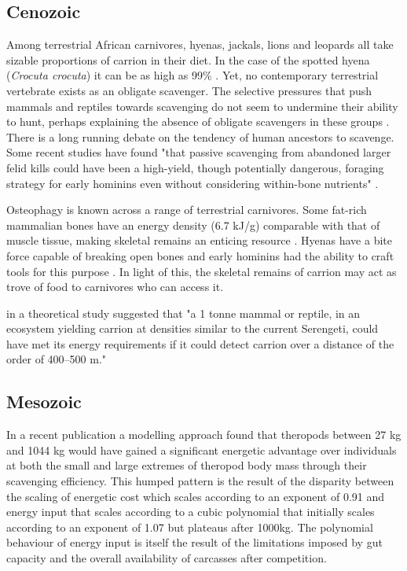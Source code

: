\documentclass[a4paper,12pt]{article}
\begin{document}
\subsection*{Cenozoic}
Among terrestrial African carnivores, hyenas, jackals, lions and leopards all take sizable proportions of carrion in their diet.
In the case of the spotted hyena (\textit{Crocuta crocuta}) it can be as high as 99\% \citep{benbow2015introduction}. 
Yet, no contemporary terrestrial vertebrate exists as an obligate scavenger. 
The selective pressures that push mammals and reptiles towards scavenging do not seem to undermine their ability to hunt, perhaps explaining the absence of obligate scavengers in these groups \citep{ruxton2004obligate}.
\\There is a long running debate on the tendency of human ancestors to scavenge. 
Some recent studies have found "that passive scavenging from abandoned larger felid kills could have been a high-yield, though potentially dangerous, foraging strategy for early hominins even without considering within-bone nutrients" \citep{pobiner2015new}. 

Osteophagy is known across a range of terrestrial carnivores.
Some fat-rich mammalian bones have an energy density (6.7 kJ/g) comparable with that of muscle tissue, making skeletal remains an enticing resource \citep{brown1989study}. 
Hyenas have a bite force capable of breaking open bones and early hominins had the ability to craft tools for this purpose \citep{hone2010feeding,ARCM:ARCM12084}. 
In light of this, the skeletal remains of carrion may act as trove of food to carnivores who can access it.  

\cite{ruxton2004obligate} in a theoretical study suggested that "a 1 tonne mammal or reptile, in an ecosystem yielding carrion at densities similar to the current Serengeti, could have met its energy requirements if it could detect carrion over a distance of the order of 400–500 m."

\subsection*{Mesozoic}
In a recent publication a modelling approach found that theropods between 27 kg and 1044 kg would have gained a significant energetic advantage over individuals at both the small and large extremes of theropod body mass through their scavenging efficiency. 
This humped pattern is the result of the disparity between the scaling of energetic cost which scales according to an exponent of 0.91 and energy input that scales according to a cubic polynomial that initially scales according to an exponent of 1.07 but plateaus after 1000kg. 
The polynomial behaviour of energy input is itself the result of the limitations imposed by gut capacity and the overall availability of carcasses after competition.
\end{document}
